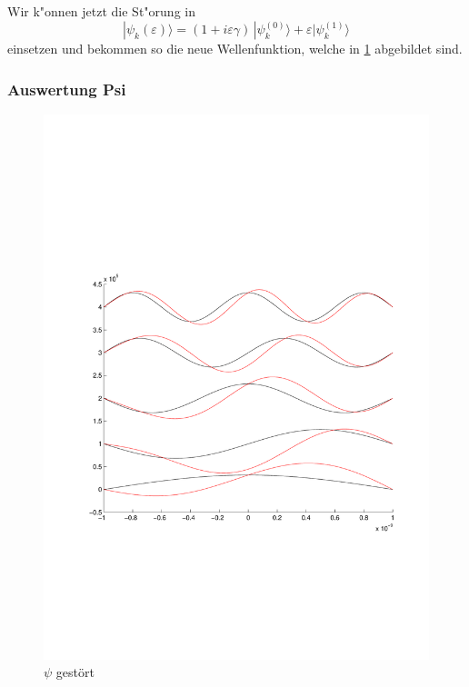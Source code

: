 \begin{refsection}
Wir k"onnen jetzt die St"orung in 
\begin{equation}
|\psi_k(\varepsilon)\rangle
=
(1+i\varepsilon \gamma)
\,|\psi_k^{(0)}\rangle
+
\varepsilon|\psi_k^{(1)}\rangle
\end{equation}
einsetzen und bekommen so die neue Wellenfunktion, welche in \ref{abb:efeld_psi_gestoert} abgebildet sind.


















\subsubsection{Auswertung Psi}

\begin{figure}
 \centering
 \includegraphics[width=12cm,clip=true,trim=2cm 7cm 1cm 8cm]{efeld/Psi_gestoert.pdf}
 \caption{$\psi$ gest\"ort}
 \label{abb:efeld_psi_gestoert}
\end{figure}


\end{refsection}
